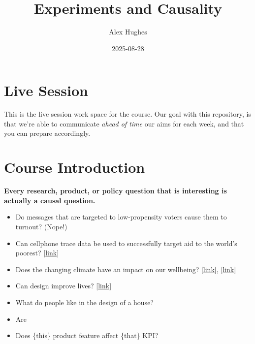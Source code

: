 \documentclass[
]{article}
\title{Experiments and Causality}
\author{Alex Hughes}
\date{2025-08-28}
\providecommand{\tightlist}{%
  \setlength{\itemsep}{0pt}\setlength{\parskip}{0pt}}
\theoremstyle{definition}
\theoremstyle{definition}
\theoremstyle{definition}
\theoremstyle{definition}
\theoremstyle{remark}
\begin{document}
\maketitle

{
\setcounter{tocdepth}{2}
\tableofcontents
}
\section*{Live Session}\label{live-session}

This is the live session work space for the course. Our goal with this repository, is that we're able to communicate \emph{ahead of time} our aims for each week, and that you can prepare accordingly.

\section*{Course Introduction}\label{course-introduction}

\textbf{Every research, product, or policy question that is interesting is actually a causal question.}

\begin{itemize}
\tightlist
\item
  Do messages that are targeted to low-propensity voters cause them to turnout? (Nope!)
\item
  Can cellphone trace data be used to successfully target aid to the world's poorest? {[}\href{https://www.science.org/doi/full/10.1126/science.aac4420}{link}{]}
\item
  Does the changing climate have an impact on our wellbeing? {[}\href{https://www.nature.com/articles/s41558-025-02407-w.epdf?sharing_token=1R7i7HQmZSSn5RoBQL9BcdRgN0jAjWel9jnR3ZoTv0NQU4QOz585FcTVcOtuamxH0qqRjWiYywlQS6ZiO9b7jdJXSD1HHqWa-qrk7ifWBIwQ_TxVIAiaipbCTGZSPUBF-wWr1cDcazGusjFvcS5LgbGhLS7jJ-d-oNOTa-W7VJs\%3D}{link}{]}, {[}\href{https://www.science.org/doi/full/10.1126/sciadv.1601555}{link}{]}
\item
  Can design improve lives? {[}\href{https://www.whitehouse.gov/presidential-actions/2025/08/improving-our-nation-through-better-design/}{link}{]}
\item
  What do people like in the design of a house?
\item
  Are
\item
  Does \{this\} product feature affect \{that\} KPI?
\end{itemize}
\end{document}
